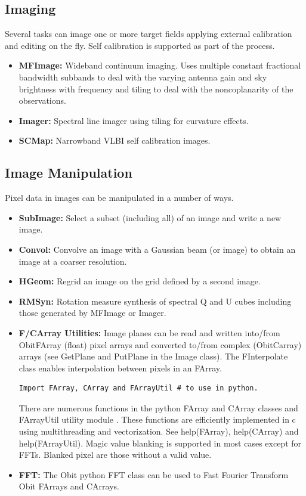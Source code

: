\documentclass[11pt]{report}
\begin{document}
\subsection{Imaging}
Several tasks can image one or more target fields applying
external calibration and editing on the fly.
Self calibration is supported as part of the process.
\begin{itemize}
\item {\bf MFImage:}  Wideband continuum imaging. 
Uses multiple constant fractional bandwidth subbands to deal with the
varying antenna gain and sky brightness with frequency and tiling to
deal with the noncoplanarity of the observations.
\item {\bf Imager:} Spectral line imager using tiling for
  curvature effects.
\item {\bf SCMap:} Narrowband VLBI self calibration images.
\end{itemize}


\subsection{Image Manipulation}
Pixel data in images can be manipulated in a number of ways.
\begin{itemize}
\item {\bf SubImage:} Select a subset (including all) of an image and
  write a new image.
\item {\bf Convol:} Convolve an image with a Gaussian beam (or image)
  to obtain an image at a coarser resolution.
\item {\bf HGeom:} Regrid an image on the grid defined by a second image.
\item {\bf RMSyn:} Rotation measure synthesis of spectral Q and U
  cubes including those generated by MFImage or Imager.
\item {\bf F/CArray Utilities:} Image planes can be read and written
  into/from ObitFArray (float) pixel arrays and converted to/from
  complex (ObitCarray) arrays (see GetPlane and PutPlane in the Image
  class). 
The FInterpolate class enables interpolation between pixels in an FArray.
\begin{verbatim}
Import FArray, CArray and FArrayUtil # to use in python.
\end{verbatim}
  There are numerous functions in the python FArray and CArray classes
  and FArrayUtil utility module .
These functions are efficiently implemented in c using multithreading
and vectorization.
See help(FArray), help(CArray) and help(FArrayUtil).
Magic value blanking is supported in most cases except for
FFTs.
Blanked pixel are those without a valid value.
\item {\bf FFT:} The Obit python FFT class can be used to Fast Fourier
  Transform Obit FArrays and CArrays.
\end{itemize}
\end{document}
